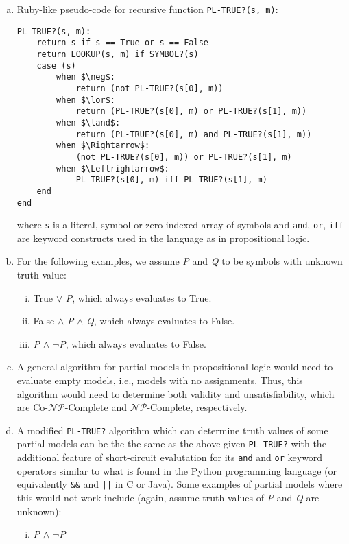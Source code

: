 \documentclass{scrartcl}
\begin{document}
\begin{enumerate}[(a)]
    \item Ruby-like pseudo-code for recursive function \verb|PL-TRUE?(s, m)|:
\begin{lstlisting}
PL-TRUE?(s, m):
    return s if s == True or s == False
    return LOOKUP(s, m) if SYMBOL?(s)
    case (s)
        when $\neg$:
            return (not PL-TRUE?(s[0], m))
        when $\lor$:
            return (PL-TRUE?(s[0], m) or PL-TRUE?(s[1], m))
        when $\land$:
            return (PL-TRUE?(s[0], m) and PL-TRUE?(s[1], m))
        when $\Rightarrow$:
            (not PL-TRUE?(s[0], m)) or PL-TRUE?(s[1], m)
        when $\Leftrightarrow$:
            PL-TRUE?(s[0], m) iff PL-TRUE?(s[1], m)
    end
end
\end{lstlisting}
        where \verb|s| is a literal, symbol or zero-indexed array of symbols and \verb|and|,
        \verb|or|, \verb|iff| are keyword constructs used in the language as in propositional logic.
    \item For the following examples, we assume \emph{P} and \emph{Q} to be symbols with unknown
        truth value:
        \begin{enumerate}[(i)]
            \item True $\lor$ \emph{P}, which always evaluates to True.
            \item False $\land$ \emph{P} $\land$ \emph{Q}, which always evaluates to False.
            \item \emph{P} $\land$ $\neg$\emph{P}, which always evaluates to False.
        \end{enumerate}
    \item A general algorithm for partial models in propositional logic would need to evaluate empty
        models, i.e., models with no assignments. Thus, this algorithm would need to determine both
        validity and unsatisfiability, which are Co-$\mathcal{NP}$-Complete and
        $\mathcal{NP}$-Complete, respectively.
    \item A modified \verb|PL-TRUE?| algorithm which can determine truth values of some partial
        models can be the the same as the above given \verb|PL-TRUE?| with the additional feature of
        short-circuit evalutation for its \verb|and| and \verb|or| keyword operators similar to what
        is found in the Python programming language (or equivalently \verb|&&| and \verb:||: in
        C or Java). Some examples of partial models where this would not work include (again, assume
        truth values of \emph{P} and \emph{Q} are unknown):
        \begin{enumerate}[(i)]
            \item \emph{P} $\land$ $\neg$\emph{P}
        \end{enumerate}
\end{enumerate}
\end{document}
